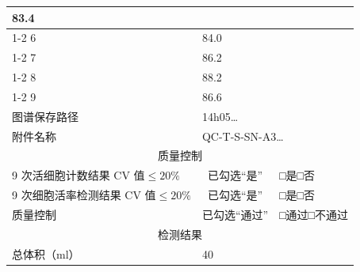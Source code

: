 \documentclass[UTF8,10pt,a4paper,fontset=fandol]{ctexart}
\newcommand{\fieldvalue}[1]{#1}
\newcommand{\handwritten}[1]{#1}
\begin{document}
\begin{center}
\begin{center}
\begin{tabularx}{\textwidth}{|l|X|l|X|}
\fieldvalue{\handwritten{83.4}} & & \\
\cline{1-2}
6 &
\fieldvalue{\handwritten{84.0}} & & \\
\cline{1-2}
7 &
\fieldvalue{\handwritten{86.2}} & & \\
\cline{1-2}
8 &
\fieldvalue{\handwritten{88.2}} & & \\
\cline{1-2}
9 &
\fieldvalue{\handwritten{86.6}} & & \\
\hline
\multicolumn{1}{|l|}{图谱保存路径} &
\multicolumn{3}{l|}{%
\fieldvalue{\handwritten{14h05\ldots}}} \\
\hline
\multicolumn{1}{|l|}{附件名称} &
\multicolumn{3}{l|}{%
\fieldvalue{\handwritten{QC-T-S-SN-A3\ldots}}} \\
\hline
\multicolumn{4}{|c|}{质量控制} \\
\hline
9 次活细胞计数结果 CV 值$\leq20\%$ &
\multicolumn{1}{c|}{%
\fieldvalue{\handwritten{已勾选“是”}}} &
\multicolumn{2}{l|}{□是\qquad □否} \\
\hline
9 次细胞活率检测结果 CV 值$\leq20\%$ &
\multicolumn{1}{c|}{%
\fieldvalue{\handwritten{已勾选“是”}}} &
\multicolumn{2}{l|}{□是\qquad □否} \\
\hline
质量控制 &
\multicolumn{1}{c|}{%
\fieldvalue{\handwritten{已勾选“通过”}}} &
\multicolumn{2}{l|}{□通过\qquad □不通过} \\
\hline
\multicolumn{4}{|c|}{检测结果} \\
\hline
总体积（ml） &
\multicolumn{3}{l|}{%
\fieldvalue{\handwritten{40}}} \\

\end{tabularx}
\end{center}
\end{center}
\end{document}
